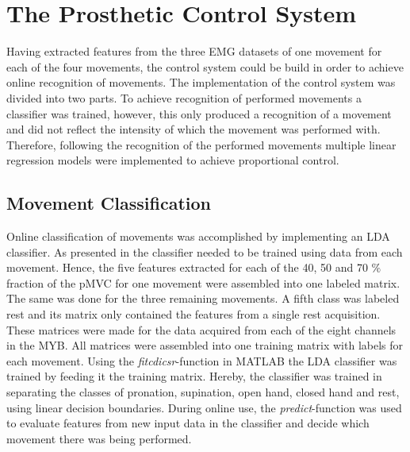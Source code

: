 
\section{The Prosthetic Control System}

Having extracted features from the three EMG datasets of one movement for each of the four movements, the control system could be build in order to achieve online recognition of movements. The implementation of the control system was divided into two parts. To achieve recognition of performed movements a classifier was trained, however, this only produced a recognition of a movement and did not reflect the intensity of which the movement was performed with. Therefore, following the recognition of the performed movements multiple linear regression models were implemented to achieve proportional control. 

\subsection{Movement Classification}

Online classification of movements was accomplished by implementing an LDA classifier. As presented in  the classifier needed to be trained using data from each movement. Hence, the five features extracted for each of the 40, 50 and 70 $\percent$ fraction of the pMVC for one movement were assembled into one labeled matrix. The same was done for the three remaining movements. A fifth class was labeled rest and its matrix only contained the features from a single rest acquisition. These matrices were made for the data acquired from each of the eight channels in the MYB. All matrices were assembled into one training matrix with labels for each movement. Using the \textit{fitcdicsr}-function in MATLAB the LDA classifier was trained by feeding it the training matrix. Hereby, the classifier was trained in separating the classes of pronation, supination, open hand, closed hand and rest, using linear decision boundaries. During online use, the \textit{predict}-function was used to evaluate features from new input data in the classifier and decide which movement there was being performed.    


